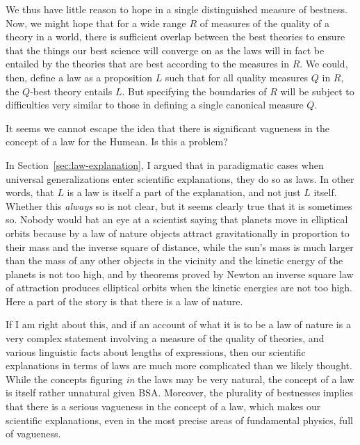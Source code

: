 We thus have little reason to hope in a single distinguished measure of bestness. Now, we might hope that for a wide range $R$ 
of measures of the quality of a theory in a world, there is sufficient overlap between the best theories to ensure that
the things our best science will converge on as the laws will in fact be entailed by the theories that are best according to the 
measures in $R$. We could, then, define a law as a proposition $L$ such that for all quality measures $Q$ in $R$, the $Q$-best theory
entails $L$. But specifying the boundaries of $R$ will be subject to difficulties very similar to those in defining a single canonical 
measure $Q$.

It seems we cannot escape the idea that there is significant vagueness in the concept of a law for the Humean.
Is this a problem?

In Section~\ref{sec:law-explanation}, I argued that in paradigmatic cases when universal generalizations enter scientific 
explanations, they do so as laws. In other words, that $L$ is a law is itself a part of the explanation, and not just $L$ itself. 
Whether this \textit{always} so is not clear, but it seems clearly true that it is sometimes so. Nobody would bat an eye 
at a scientist saying that planets move in elliptical orbits because
by a law of nature objects attract gravitationally in proportion to their mass and the inverse square of distance, while the
sun's mass is much larger than the mass of any other objects in the vicinity and the kinetic energy of the planets is not 
too high, and by theorems proved by Newton an inverse square law of attraction produces elliptical orbits when the kinetic
energies are not too high. Here a part of the story is that there is a law of nature.

If I am right about this, and if an account of what it is to be a law of nature is a very complex statement involving a measure
of the quality of theories, and various linguistic facts about lengths of expressions, then our scientific explanations in 
terms of laws are much more complicated than we likely thought. While the concepts figuring \textit{in} the laws may be very
natural, the concept of a law is itself rather unnatural given BSA. Moreover, the plurality of bestnesses implies that there is a serious
vagueness in the concept of a law, which makes our scientific explanations, even in the most precise areas of fundamental physics,
full of vagueness. 

